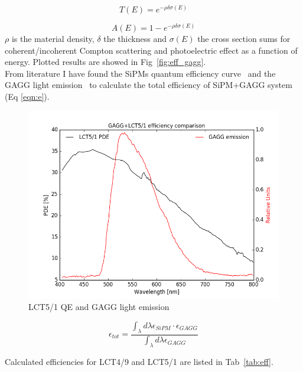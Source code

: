 \documentclass[10pt,a4paper, openany]{book}
\begin{document}
\begin{equation}
\label{eqn:t}
T(E) = e^{-\rho \delta \sigma(E)}
\end{equation}

\begin{equation}
\label{eqn:a}
A(E) = 1 - e^{-\rho \delta \sigma(E)}
\end{equation}
$\rho$ is the material density, $\delta$ the thickness and $\sigma(E)$ the cross section sums for coherent/incoherent Compton scattering and photoelectric effect as a function of energy. Plotted results are showed in Fig~\ref{fig:eff_gagg}.\\
From literature I have found the SiPMs quantum efficiency curve~\cite{bonanno:1} and the GAGG light emission~\cite{gagg:3} to calculate the total efficiency of SiPM+GAGG system (Eq \ref{eqn:e}).

\begin{figure}[!h]
\begin{center}
\includegraphics[scale=0.4]{imm/lct_gagg.png}
\end{center}
\caption{LCT5/1 QE and GAGG light emission}
\label{fig:lin1}
\end{figure}

\begin{equation}
\epsilon_{tot} = \frac{\int_{\lambda} d\lambda \epsilon_{SiPM} \cdot \epsilon_{GAGG} }{\int_{\lambda} d\lambda \epsilon_{GAGG} }
\label{eqn:e}
\end{equation}

Calculated efficiencies for LCT4/9 and LCT5/1 are listed in Tab~\ref{tab:eff}.
\end{document}

